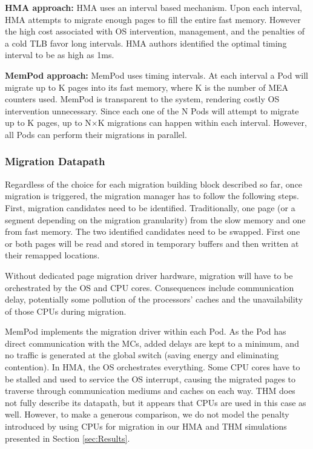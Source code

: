 	\textbf{HMA approach:} HMA uses an interval based mechanism. Upon each interval, HMA attempts to migrate enough pages to fill the entire fast memory. However the high cost associated with OS intervention, management, and the penalties of a cold TLB favor long intervals. HMA authors identified the optimal timing interval to be as high as 1ms.
	
	\textbf{MemPod approach:} MemPod uses timing intervals. At each interval a Pod will migrate up to K pages into its fast memory, where K is the number of MEA counters used. MemPod is transparent to the system, rendering costly OS intervention unnecessary. Since each one of the N Pods will attempt to migrate up to K pages, up to N$\times$K migrations can happen within each interval. However, all Pods can perform their migrations in parallel. %
	

\subsubsection{Migration Datapath}

Regardless of the choice for each migration building block described so far, once migration is triggered, the migration manager has to follow the following 
steps. First, migration candidates need to be identified. Traditionally, one page (or a segment depending on the migration granularity) from the slow memory and one from fast memory. The two identified candidates need to be swapped. First one or both pages will be read and stored in temporary buffers and then written at their remapped locations.

Without dedicated page migration driver hardware, migration will have to be orchestrated by the OS and CPU cores. Consequences include communication delay, 
potentially some pollution of the processors' caches 
and the unavailability of those CPUs during migration. 

MemPod implements the migration driver within each Pod. As the Pod has direct communication with the MCs, added delays are kept to a minimum,
and no traffic is generated at the global switch (saving energy and eliminating contention).
In HMA, the OS orchestrates everything. Some CPU cores have to be stalled and used to service the OS interrupt, causing the migrated pages to traverse through communication mediums and caches on each way. THM does not fully describe its datapath, but it appears that CPUs are used in this case as well. 
However, to make a generous comparison, we do not model the penalty introduced by using CPUs for migration in our HMA and THM simulations presented in Section \ref{sec:Results}.

